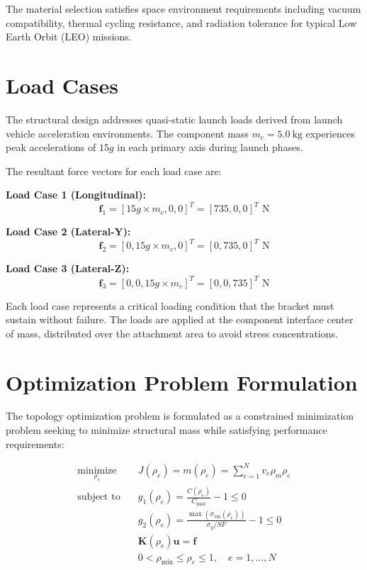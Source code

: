 \documentclass[11pt]{report}
\newcommand{\vect}[1]{\boldsymbol{#1}}
\newcommand{\matr}[1]{\mathbf{#1}}
\newcommand{\rhoe}{\rho_e}
\newcommand{\rhomin}{\rho_{\text{min}}}
\newcommand{\loadvect}{\vect{f}}
\newcommand{\dispvect}{\vect{u}}
\newcommand{\stiffmat}{\matr{K}}
\newcommand{\compliance}{C}
\newcommand{\constraint}{g}
\newcommand{\obj}{J}
\newcommand{\mass}{m}
\newcommand{\sigmavm}{\sigma_{\text{vm}}}
\newcommand{\yieldstress}{\sigma_y}
\begin{document}
The material selection satisfies space environment requirements including vacuum compatibility, thermal cycling resistance, and radiation tolerance for typical Low Earth Orbit (LEO) missions.

\section{Load Cases}
The structural design addresses quasi-static launch loads derived from launch vehicle acceleration environments. The component mass $m_c = \SI{5.0}{\kilogram}$ experiences peak accelerations of $15g$ in each primary axis during launch phases.

The resultant force vectors for each load case are:

\textbf{Load Case 1 (Longitudinal):}
\begin{equation}
\loadvect_1 = [15g \times m_c, 0, 0]^T = [735, 0, 0]^T \text{ N}
\end{equation}

\textbf{Load Case 2 (Lateral-Y):}
\begin{equation}
\loadvect_2 = [0, 15g \times m_c, 0]^T = [0, 735, 0]^T \text{ N}
\end{equation}

\textbf{Load Case 3 (Lateral-Z):}
\begin{equation}
\loadvect_3 = [0, 0, 15g \times m_c]^T = [0, 0, 735]^T \text{ N}
\end{equation}

Each load case represents a critical loading condition that the bracket must sustain without failure. The loads are applied at the component interface center of mass, distributed over the attachment area to avoid stress concentrations.

\section{Optimization Problem Formulation}
The topology optimization problem is formulated as a constrained minimization problem seeking to minimize structural mass while satisfying performance requirements:

\begin{align}
\underset{\rhoe}{\text{minimize}} \quad & \obj(\rhoe) = \mass(\rhoe) = \sum_{e=1}^{N} v_e \rho_m \rhoe \\
\text{subject to} \quad & \constraint_1(\rhoe) = \frac{\compliance(\rhoe)}{\compliance_{\text{max}}} - 1 \leq 0 \\
& \constraint_2(\rhoe) = \frac{\max(\sigmavm(\rhoe))}{\yieldstress/SF} - 1 \leq 0 \\
& \stiffmat(\rhoe) \dispvect = \loadvect \\
& 0 < \rhomin \leq \rhoe \leq 1, \quad e = 1, \ldots, N
\end{align}
\end{document}
